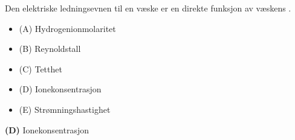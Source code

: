 

Den elektriske ledningsevnen til en væske er en direkte funksjon av væskens \underbar{\hskip 50pt}.

\begin{itemize}
\item{(A)} Hydrogenionmolaritet
\vskip 5pt 
\item{(B)} Reynoldstall
\vskip 5pt 
\item{(C)} Tetthet
\vskip 5pt 
\item{(D)} Ionekonsentrasjon
\vskip 5pt 
\item{(E)} Strømningshastighet
\end{itemize}







{\bf (D)} Ionekonsentrasjon
 







